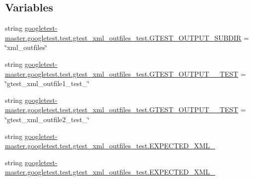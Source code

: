 \subsection*{Variables}
\begin{DoxyCompactItemize}
\item 
string \mbox{\hyperlink{namespacegoogletest-master_1_1googletest_1_1test_1_1gtest__xml__outfiles__test_afba756d34be3d8239e6f5175f5048672}{googletest-\/master.\+googletest.\+test.\+gtest\+\_\+xml\+\_\+outfiles\+\_\+test.\+G\+T\+E\+S\+T\+\_\+\+O\+U\+T\+P\+U\+T\+\_\+\+S\+U\+B\+D\+IR}} = \char`\"{}xml\+\_\+outfiles\char`\"{}
\item 
string \mbox{\hyperlink{namespacegoogletest-master_1_1googletest_1_1test_1_1gtest__xml__outfiles__test_a91e8f1e875a8289d7be93462edecb1fa}{googletest-\/master.\+googletest.\+test.\+gtest\+\_\+xml\+\_\+outfiles\+\_\+test.\+G\+T\+E\+S\+T\+\_\+\+O\+U\+T\+P\+U\+T\+\_\+\_\+\+T\+E\+ST}} = \char`\"{}gtest\+\_\+xml\+\_\+outfile1\+\_\+test\+\_\+\char`\"{}
\item 
string \mbox{\hyperlink{namespacegoogletest-master_1_1googletest_1_1test_1_1gtest__xml__outfiles__test_a18e45e2741c8f08801a6bca16ef5d064}{googletest-\/master.\+googletest.\+test.\+gtest\+\_\+xml\+\_\+outfiles\+\_\+test.\+G\+T\+E\+S\+T\+\_\+\+O\+U\+T\+P\+U\+T\+\_\+\_\+\+T\+E\+ST}} = \char`\"{}gtest\+\_\+xml\+\_\+outfile2\+\_\+test\+\_\+\char`\"{}
\item 
string \mbox{\hyperlink{namespacegoogletest-master_1_1googletest_1_1test_1_1gtest__xml__outfiles__test_ab1e16abee0cb58fb7242f8c4f6d306a8}{googletest-\/master.\+googletest.\+test.\+gtest\+\_\+xml\+\_\+outfiles\+\_\+test.\+E\+X\+P\+E\+C\+T\+E\+D\+\_\+\+X\+M\+L\+\_}}
\item 
string \mbox{\hyperlink{namespacegoogletest-master_1_1googletest_1_1test_1_1gtest__xml__outfiles__test_a8103ee3053cc81a14445bace13373644}{googletest-\/master.\+googletest.\+test.\+gtest\+\_\+xml\+\_\+outfiles\+\_\+test.\+E\+X\+P\+E\+C\+T\+E\+D\+\_\+\+X\+M\+L\+\_}}
\end{DoxyCompactItemize}
